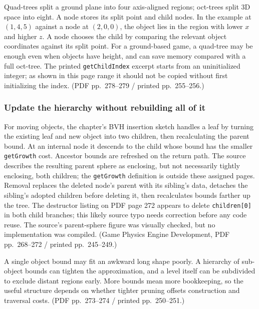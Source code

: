 Quad-trees split a ground plane into four axis-aligned regions; oct-trees split 3D space into eight. A node stores its split point and child nodes. In the example at \((1,4,5)\) against a node at \((2,0,0)\), the object lies in the region with lower \(x\) and higher \(z\). A node chooses the child by comparing the relevant object coordinates against its split point. For a ground-based game, a quad-tree may be enough even when objects have height, and can save memory compared with a full oct-tree. The printed \texttt{getChildIndex} excerpt starts from an uninitialized integer; as shown in this page range it should not be copied without first initializing the index. (PDF pp.~278--279 / printed pp.~255--256.)

\subsubsection{Update the hierarchy without rebuilding all of it}\label{06-engine-ii-ch033-update-the-hierarchy-without-rebuilding-all-of-it}

\hypertarget{06-engine-ii-ch033-update-the-hierarchy-without-rebuilding-all-of-it}{}

For moving objects, the chapter's BVH insertion sketch handles a leaf by turning the existing leaf and new object into two children, then recalculating the parent bound. At an internal node it descends to the child whose bound has the smaller \texttt{getGrowth} cost. Ancestor bounds are refreshed on the return path. The source describes the resulting parent sphere as enclosing, but not necessarily tightly enclosing, both children; the \texttt{getGrowth} definition is outside these assigned pages. Removal replaces the deleted node's parent with its sibling's data, detaches the sibling's adopted children before deleting it, then recalculates bounds farther up the tree. The destructor listing on PDF page 272 appears to delete \texttt{children{[}0{]}} in both child branches; this likely source typo needs correction before any code reuse. The source's parent-sphere figure was visually checked, but no implementation was compiled. (Game Physics Engine Development, PDF pp.~268--272 / printed pp.~245--249.)

A single object bound may fit an awkward long shape poorly. A hierarchy of sub-object bounds can tighten the approximation, and a level itself can be subdivided to exclude distant regions early. More bounds mean more bookkeeping, so the useful structure depends on whether tighter pruning offsets construction and traversal costs. (PDF pp.~273--274 / printed pp.~250--251.)

